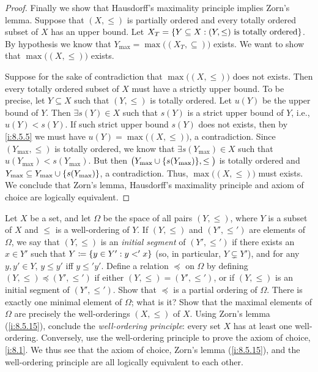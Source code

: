 \begin{proof}
  Finally we show that Hausdorff's maximality principle implies Zorn's lemma.
  Suppose that \((X, \leq)\) is partially ordered and every totally ordered subset of \(X\) has an upper bound.
  Let \(X_T = \left\lbrace Y \subseteq X : (Y, \leq) \text{ is totally ordered}\right\rbrace\).
  By hypothesis we know that \(Y_{\max} = \max\big((X_T, \subseteq)\big)\) exists.
  We want to show that \(\max\big((X, \leq)\big)\) exists.

  Suppose for the sake of contradiction that \(\max\big((X, \leq)\big)\) does not exists.
  Then every totally ordered subset of \(X\) must have a strictly upper bound.
  To be precise, let \(Y \subseteq X\) such that \((Y, \leq)\) is totally ordered.
  Let \(u(Y)\) be the upper bound of \(Y\).
  Then \(\exists s(Y) \in X\) such that \(s(Y)\) is a strict upper bound of \(Y\), i.e., \(u(Y) < s(Y)\).
  If such strict upper bound \(s(Y)\) does not exists, then by \cref{i:8.5.5} we must have \(u(Y) = \max\big((X, \leq)\big)\), a contradiction.
  Since \((Y_{\max}, \leq)\) is totally ordered, we know that \(\exists s(Y_{\max}) \in X\) such that \(u(Y_{\max}) < s(Y_{\max})\).
  But then \(\big(Y_{\max} \cup \set{s(Y_{\max})}, \leq\big)\) is totally ordered and \(Y_{\max} \subseteq Y_{\max} \cup \left\lbrace s(Y_{\max})\right\rbrace\), a contradiction.
  Thus, \(\max\big((X, \leq)\big)\) must exists.
  We conclude that Zorn's lemma, Hausdorff's maximality principle and axiom of choice are logically equivalent.
\end{proof}

\begin{ex}\label{i:ex:8.5.19}
  Let \(X\) be a set, and let \(\Omega\) be the space of all pairs \((Y, \leq)\), where \(Y\) is a subset of \(X\) and \(\leq\) is a well-ordering of \(Y\).
  If \((Y, \leq)\) and \((Y', \leq')\) are elements of \(\Omega\), we say that \((Y, \leq)\) is an \emph{initial segment} of \((Y', \leq')\) if there exists an \(x \in Y'\) such that \(Y \coloneqq \left\lbrace y \in Y' : y <' x\right\rbrace\) (so, in particular, \(Y \subsetneq Y'\)), and for any \(y, y' \in Y\), \(y \leq y'\) iff \(y \leq' y'\).
  Define a relation \(\preceq\) on \(\Omega\) by defining \((Y, \leq) \preceq (Y', \leq')\) if either \((Y, \leq) = (Y', \leq')\), or if \((Y, \leq)\) is an initial segment of \((Y', \leq')\).
  Show that \(\preceq\) is a partial ordering of \(\Omega\).
  There is exactly one minimal element of \(\Omega\);
  what is it?
  Show that the maximal elements of \(\Omega\) are precisely the well-orderings \((X, \leq)\) of \(X\).
  Using Zorn's lemma (\cref{i:8.5.15}), conclude the \emph{well-ordering principle}:
  every set \(X\) has at least one well-ordering.
  Conversely, use the well-ordering principle to prove the axiom of choice, \cref{i:8.1}.
  We thus see that the axiom of choice, Zorn's lemma (\cref{i:8.5.15}), and the well-ordering principle are all logically equivalent to each other.
\end{ex}

